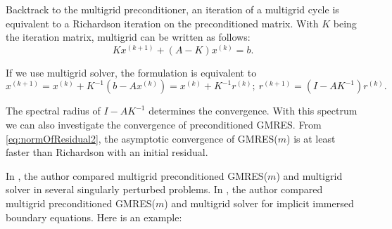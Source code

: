 Backtrack to the multigrid preconditioner, an iteration of a multigrid
cycle is equivalent to a Richardson iteration on  the preconditioned
matrix\cite{oosterlee_evaluation_1998}. With $K$ being the iteration
matrix, multigrid
can be written as follows:
\begin{equation}
  \label{eq:RichardsonIter}
  Kx^{(k+1)}+(A-K)x^{(k)}=b.
\end{equation}

If we use multigrid solver, the formulation is equivalent to
\begin{equation}
  \label{eq:Richardson2}
  x^{(k+1)} = x^{(k)} + K^{-1}(b-Ax^{(k)}) = x^{(k)}+K^{-1}r^{(k)};\
  r^{(k+1)} = (I-AK^{-1})r^{(k)}.
\end{equation}

The spectral radius of $I-AK^{-1}$ determines the convergence. With
this spectrum we can also investigate the convergence of
preconditioned GMRES. From \eqref{eq:normOfResidual2}, the asymptotic
convergence of GMRES($m$) is at least faster than Richardson with an initial
residual. 

In \cite{oosterlee_evaluation_1998}, the author compared multigrid preconditioned
GMRES($m$) and multigrid solver in several singularly perturbed
problems. In \cite{guy_multigrid_2012}, the author compared multigrid
preconditioned GMRES($m$) and multigrid solver for implicit immersed
boundary equations. Here is an example:

